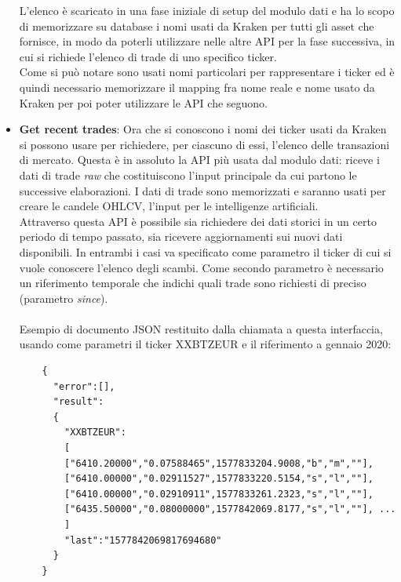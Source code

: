 \documentclass[a4paper,12pt]{report}
\begin{document}
\begin{itemize}
\begin{itemize}
	\end{itemize}
	
	L'elenco è scaricato in una fase iniziale di setup del modulo dati e ha lo scopo di memorizzare su database i nomi usati da Kraken per tutti gli asset che fornisce, in modo da poterli utilizzare nelle altre API per la fase successiva, in cui si richiede l'elenco di trade di uno specifico ticker.\\Come si può notare sono usati nomi particolari per rappresentare i ticker ed è quindi necessario memorizzare il mapping fra nome reale e nome usato da Kraken per poi poter utilizzare le API che seguono.\\
	
	\item \textbf{Get recent trades}: Ora che si conoscono i nomi dei ticker usati da Kraken si possono usare per richiedere, per ciascuno di essi, l'elenco delle transazioni di mercato. Questa è in assoluto la API più usata dal modulo dati: riceve i dati di trade \textit{raw} che costituiscono l'input principale da cui partono le successive elaborazioni. I dati di trade sono memorizzati e saranno usati per creare le candele OHLCV, l'input per le intelligenze artificiali.\\
	Attraverso questa API è possibile sia richiedere dei dati storici in un certo periodo di tempo passato, sia ricevere aggiornamenti sui nuovi dati disponibili. In entrambi i casi va specificato come parametro il ticker di cui si vuole conoscere l'elenco degli scambi. Come secondo parametro è necessario un riferimento temporale che indichi quali trade sono richiesti di preciso (parametro \textit{since}).\\~\\%
	Esempio di documento JSON restituito dalla chiamata a questa interfaccia, usando come parametri il ticker XXBTZEUR e il riferimento a gennaio 2020:
	\begin{verbatim}
	{
	  "error":[],
	  "result":
	  {
	    "XXBTZEUR":
	    [
        ["6410.20000","0.07588465",1577833204.9008,"b","m",""],
        ["6410.00000","0.02911527",1577833220.5154,"s","l",""],
        ["6410.00000","0.02910911",1577833261.2323,"s","l",""],
        ["6435.50000","0.08000000",1577842069.8177,"s","l",""], ...
	    ]
	    "last":"1577842069817694680"
	  }
	}
	\end{verbatim}


\end{itemize}
\end{document}
